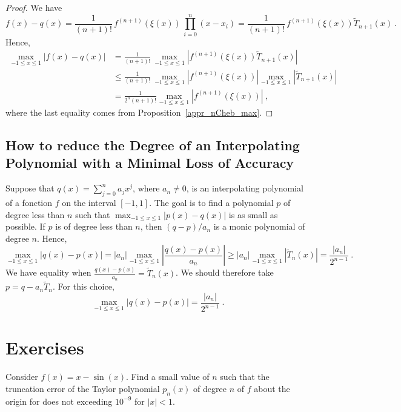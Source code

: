 \begin{proof}
We have
\[
f(x) - q(x) = \frac{1}{(n+1)!}\, f^{(n+1)}(\xi(x)) \,
\prod_{i=0}^n (x-x_i) = \frac{1}{(n+1)!}\, f^{(n+1)}(\xi(x))
\tilde{T}_{n+1}(x) \  .
\]
Hence,
\begin{align*}
\max_{-1\leq x \leq 1} \left| f(x) - q(x) \right| &= \frac{1}{(n+1)!}\, 
\max_{-1\leq x \leq 1} \left| f^{(n+1)}(\xi(x)) \tilde{T}_{n+1}(x) \right| \\
&\leq \frac{1}{(n+1)!}\, \max_{-1\leq x \leq 1} \left| f^{(n+1)}(\xi(x))\right|
\max_{-1\leq x \leq 1} \left| \tilde{T}_{n+1}(x) \right| \\
&= \frac{1}{2^n(n+1)!} \max_{-1\leq x \leq 1} \left| f^{(n+1)}(\xi(x))\right|
\ ,
\end{align*}
where the last equality comes from Proposition~\ref{appr_nCheb_max}.
\end{proof}

\subsection{How to reduce the Degree of an Interpolating
Polynomial with a  Minimal Loss of Accuracy} \label{bestInterPol}

Suppose that $\displaystyle q(x) = \sum_{j=0}^n a_j x^j$, where
$a_n \neq 0$, is an interpolating polynomial of a fonction $f$ on the
interval $[-1,1]$.  The goal is to find a polynomial $p$ of degree less than
$n$ such that
$\displaystyle \max_{-1\leq x \leq 1} \left| p(x) - q(x) \right|$ is as small
as possible.  If $p$ is of degree less than $n$, then
$\displaystyle (q-p)/a_n$ is a monic polynomial of degree $n$.  Hence,
\[
\max_{-1\leq x \leq 1} \left| q(x)-p(x)\right| =
|a_n| \max_{-1\leq x \leq 1} \left| \frac{q(x)-p(x)}{a_n} \right|
\geq |a_n| \max_{-1\leq x \leq 1} \left| \tilde{T}_n(x) \right|
= \frac{|a_n|}{2^{n-1}} \ .
\]
We have equality when
$\displaystyle \frac{q(x)-p(x)}{a_n} = \tilde{T}_n(x)$.  We should
therefore take $p = q - a_n \tilde{T}_n$.  For this choice,
\[
\max_{-1\leq x \leq 1} \left| q(x)-p(x)\right| = \frac{|a_n|}{2^{n-1}} \ .
\]

\section{Exercises}

\begin{question}
Consider $f(x) = x -\sin(x)$.  Find a small value of $n$ such that the
truncation error of the Taylor polynomial $p_n(x)$ of degree $n$ of
$f$ about the origin for does not exceeding $10^{-9}$ for $|x|<1$.
\label{approxBQ1}
\end{question}


